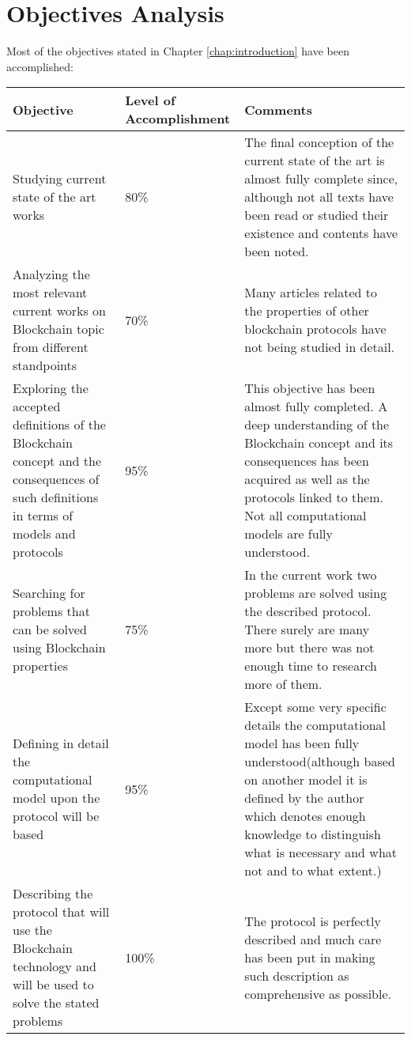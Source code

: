 \documentclass[..]{subfiles}
\begin{document}
\section{Objectives Analysis}

Most of the objectives stated in Chapter \ref{chap:introduction} have been accomplished:

\begin{centering}
	\begin{longtable}{|m{}<{\centering}|m{}<{\centering}|m{}<{\centering}|}
		\hline
		\textbf{Objective} & \textbf{Level of Accomplishment} & \textbf{Comments}\\
		\hline
		Studying current state of the art works & 80\% & The final conception of the current state of the art is almost fully complete since, although not all texts have been read or studied their existence and contents have been noted.\\
		\hline
		Analyzing the most relevant current works on Blockchain topic from different standpoints & 70\% & Many articles related to the properties of other blockchain protocols have not being studied in detail.\\
		\hline
		Exploring the accepted definitions of the Blockchain concept and the consequences of such definitions in terms of models and protocols & 95\% & This objective has been almost fully completed. A deep understanding of the Blockchain concept and its consequences has been acquired as well as the protocols linked to them. Not all computational models are fully understood. \\
		\hline
		Searching for problems that can be solved using Blockchain properties & 75\% & In the current work two problems are solved using the described protocol. There surely are many more but there was not enough time to research more of them.\\
		\hline
		Defining in detail the computational model upon the protocol will be based & 95\% & Except some very specific details the computational model has been fully understood(although based on another model it is defined by the author which denotes enough knowledge to distinguish what is necessary and what not and to what extent.)\\
		\hline
		Describing the protocol that will use the Blockchain technology and will be used to solve the stated problems & 100\% & The protocol is perfectly described and much care has been put in making such description as comprehensive as possible.\\

\end{longtable}
\end{centering}
\end{document}
